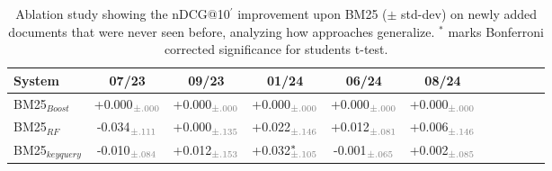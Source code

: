 \begin{table}[t]
\small
\centering
\renewcommand{\tabcolsep}{2.8pt}
\caption{Ablation study showing the nDCG@10$^{'}$ improvement upon BM25  ($\pm$ std-dev) on newly added documents that were never seen before, analyzing how approaches generalize. $^{*}$ marks Bonferroni corrected significance for students t-test.}
\label{tab:table-results-fold}

\begin{tabular}{@{}lcccccccccc@{}}
    \toprule
    \bfseries System & \bfseries 07/23 & \bfseries 09/23 & \bfseries 01/24 & \bfseries 06/24 & \bfseries 08/24 \\
    
    \midrule

    
BM25$_{Boost}$ & +0.000$^{\phantom{*}}_{\color{gray}\pm.000}$ & +0.000$^{\phantom{*}}_{\color{gray}\pm.000}$ & +0.000$^{\phantom{*}}_{\color{gray}\pm.000}$ & +0.000$^{\phantom{*}}_{\color{gray}\pm.000}$ & +0.000$^{\phantom{*}}_{\color{gray}\pm.000}$ \\
    BM25$_{RF}$ & -0.034$^{\phantom{*}}_{\color{gray}\pm.111}$ & +0.000$^{\phantom{*}}_{\color{gray}\pm.135}$ & +0.022$^{\phantom{*}}_{\color{gray}\pm.146}$ & +0.012$^{\phantom{*}}_{\color{gray}\pm.081}$ & +0.006$^{\phantom{*}}_{\color{gray}\pm.146}$ \\
    BM25$_{keyquery}$ & -0.010$^{\phantom{*}}_{\color{gray}\pm.084}$ & +0.012$^{\phantom{*}}_{\color{gray}\pm.153}$ & +0.032$^{*}_{\color{gray}\pm.105}$ & -0.001$^{\phantom{*}}_{\color{gray}\pm.065}$ & +0.002$^{\phantom{*}}_{\color{gray}\pm.085}$ \\




\bottomrule
\end{tabular}
\end{table}
